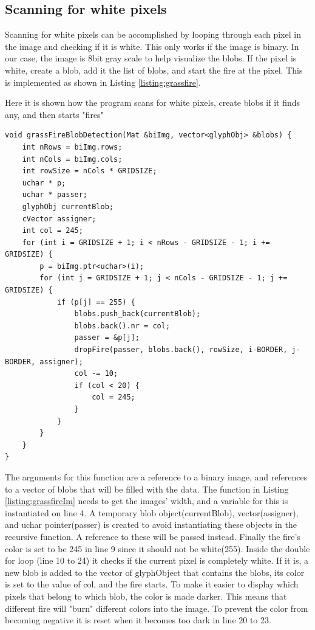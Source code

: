 \subsection{Scanning for white pixels}
Scanning for white pixels can be accomplished by looping through each pixel in the image and checking if it is white. This only works if the image is binary. In our case, the image is 8bit gray scale to help visualize the blobs. If the pixel is white, create a blob, add it the list of blobs, and start the fire at the pixel. This is implemented as shown in Listing \autoref{listing:grassfire}.
\begin{listing}[H]
	\caption{Here it is shown how the program scans for white pixels, create blobs if it finds any, and then starts "fires"}
	\begin{verbatim}
void grassFireBlobDetection(Mat &biImg, vector<glyphObj> &blobs) {
	int nRows = biImg.rows;
	int nCols = biImg.cols;
	int rowSize = nCols * GRIDSIZE;
	uchar * p;
	uchar * passer;
	glyphObj currentBlob;
	cVector assigner;
	int col = 245;
	for (int i = GRIDSIZE + 1; i < nRows - GRIDSIZE - 1; i += GRIDSIZE) {
		p = biImg.ptr<uchar>(i);
		for (int j = GRIDSIZE + 1; j < nCols - GRIDSIZE - 1; j += GRIDSIZE) {
			if (p[j] == 255) {
				blobs.push_back(currentBlob);
				blobs.back().nr = col;
				passer = &p[j];
				dropFire(passer, blobs.back(), rowSize, i-BORDER, j-BORDER, assigner);
				col -= 10;
				if (col < 20) {
					col = 245;
				}
			}
		}
	}
}
	\end{verbatim}
	\label{listing:grassfire}
\end{listing}
The arguments for this function are a reference to a binary image, and references to a vector of blobs that will be filled with the data. The  function in Listing \ref{listing:grassfireIm} needs to get the images' width, and a variable for this is instantiated on line 4. A temporary blob object(currentBlob), vector(assigner), and uchar pointer(passer) is created to avoid instantiating these objects in the recursive function. A reference to these will be passed instead. Finally the fire's color is set to be 245 in line 9 since it should not be white(255). Inside the double for loop (line 10 to 24) it checks if the current pixel is completely white. If it is, a new blob is added to the vector of glyphObject that contains the blobs, its color is set to the value of col, and the fire starts. To make it easier to display which pixels that belong to which blob, the color is made darker. This means that different fire will "burn" different colors into the image. To prevent the color from becoming negative it is reset when it becomes too dark in line 20 to 23.\\
